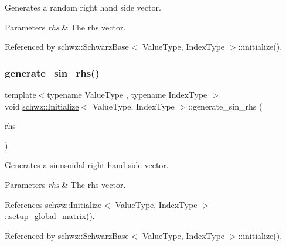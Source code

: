 Generates a random right hand side vector. 


\begin{DoxyParams}{Parameters}
{\em rhs} & The rhs vector. \\
\hline
\end{DoxyParams}


Referenced by schwz\+::\+Schwarz\+Base$<$ Value\+Type, Index\+Type $>$\+::initialize().

\mbox{\label{classschwz_1_1Initialize_a1b1151ac7f561c1ca4eeac389841e898}} 
\subsubsection{\texorpdfstring{generate\+\_\+sin\+\_\+rhs()}{generate\_sin\_rhs()}}
{\footnotesize\ttfamily template$<$typename Value\+Type , typename Index\+Type $>$ \\
void \hyperlink{classschwz_1_1Initialize}{schwz\+::\+Initialize}$<$ Value\+Type, Index\+Type $>$\+::generate\+\_\+sin\+\_\+rhs (\begin{DoxyParamCaption}\item[{std\+::vector$<$ Value\+Type $>$ \&}]{rhs }\end{DoxyParamCaption})}



Generates a sinusoidal right hand side vector. 


\begin{DoxyParams}{Parameters}
{\em rhs} & The rhs vector. \\
\hline
\end{DoxyParams}


References schwz\+::\+Initialize$<$ Value\+Type, Index\+Type $>$\+::setup\+\_\+global\+\_\+matrix().



Referenced by schwz\+::\+Schwarz\+Base$<$ Value\+Type, Index\+Type $>$\+::initialize().

\mbox{\label{classschwz_1_1Initialize_a23a10058e35a442c564c0748b66dcb08}} 
